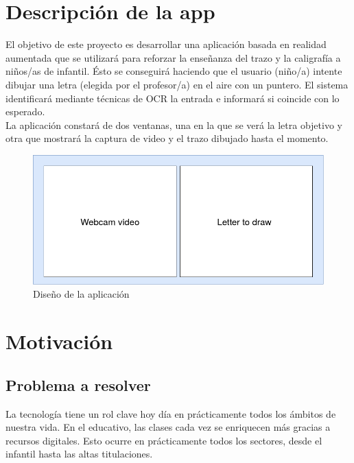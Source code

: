 \documentclass[12pt,spanish]{article}
\begin{document}
\section{Descripción de la app}

El objetivo de este proyecto es desarrollar una aplicación basada en realidad aumentada que se utilizará para reforzar la enseñanza del trazo y la caligrafía a niños/as de infantil. Ésto se conseguirá haciendo que el usuario (niño/a) intente dibujar una letra (elegida por el profesor/a) en el aire con un puntero. El sistema identificará mediante técnicas de OCR la entrada e informará si coincide con lo esperado.\\

La aplicación constará de dos ventanas, una en la que se verá la letra objetivo y otra que mostrará la captura de video y el trazo dibujado hasta el momento.\\

\begin{figure}[H]
	\centering
	\includegraphics[scale=0.5]{initial_app_layout.png}
	\caption{Diseño de la aplicación}
\end{figure}

\newpage
\section{Motivación}

\subsection{Problema a resolver}
\label{problema}

La tecnología tiene un rol clave hoy día en prácticamente todos los ámbitos de nuestra vida. En el educativo, las clases cada vez se enriquecen más gracias a recursos digitales. Esto ocurre en prácticamente todos los sectores, desde el infantil hasta las altas titulaciones. \\
\end{document}

